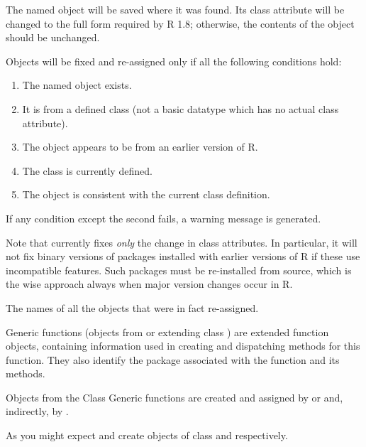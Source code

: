 \begin{Details}\relax
The named object will be saved where it was found.  Its class
attribute will be changed to the full form required by R 1.8;
otherwise, the contents of the object should be unchanged.

Objects will be fixed and re-assigned only if all the following
conditions hold:
\begin{enumerate}

\item The named object exists.
\item It is from a defined class (not a basic datatype which
has no actual class attribute).
\item The object appears to be from an earlier version of R.
\item The class is currently defined.
\item The object is consistent with the current class definition.

\end{enumerate}

If any condition except the second fails, a warning message is
generated.

Note that  currently fixes \emph{only} the change in
class attributes.  In particular, it will not fix binary versions of
packages installed with earlier versions of R if these use
incompatible features.  Such packages must be re-installed from
source, which is the wise approach always when major version changes
occur in R.

\end{Details}
%
\begin{Value}
The names of all the objects that were in fact re-assigned.
\end{Value}
%
\begin{Description}\relax
Generic functions (objects from or extending class
) are extended function objects,
containing information used in creating and dispatching methods for
this function.  They also identify the package associated with the
function and its methods.
\end{Description}
%
\begin{Section}{Objects from the Class}
Generic functions are created and assigned by
 or  and, indirectly, by
.

As you might expect  and
 create objects of class
 and  respectively.
\end{Section}
